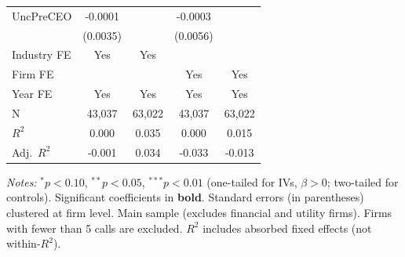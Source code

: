\begin{landscape}
\begin{table}[H]
\begin{tabular}{lcccc}
UncPreCEO & -0.0001 &  & -0.0003 &  \\
 & (0.0035) &  & (0.0056) &  \\
\midrule
Industry FE & Yes & Yes &  &  \\
Firm FE &  &  & Yes & Yes \\
Year FE & Yes & Yes & Yes & Yes \\
\midrule
N & 43,037 & 63,022 & 43,037 & 63,022 \\
$R^2$ & 0.000 & 0.035 & 0.000 & 0.015 \\
Adj.~$R^2$ & -0.001 & 0.034 & -0.033 & -0.013 \\
\bottomrule
\end{tabular}
\begin{minipage}{\linewidth}
\vspace{2pt}\scriptsize
\textit{Notes:} $^{*}p<0.10$, $^{**}p<0.05$, $^{***}p<0.01$ (one-tailed for IVs, $\beta > 0$; two-tailed for controls).
 Significant coefficients in \textbf{bold}.
 Standard errors (in parentheses) clustered at firm level.
 Main sample (excludes financial and utility firms). Firms with fewer than 5 calls are excluded.
 $R^2$ includes absorbed fixed effects (not within-$R^2$).
\end{minipage}
\end{table}
\end{landscape}